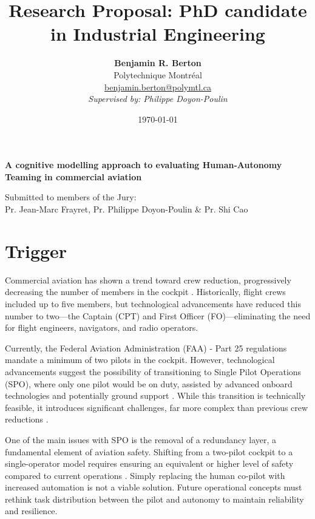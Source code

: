 \documentclass[12pt,a4paper]{article} %
\title{\textbf{Research Proposal: PhD candidate in Industrial Engineering}} %
\author{
	\textbf{Benjamin R. Berton}\\
	Polytechnique Montréal\\
	\href{mailto:benjamin.berton@polymtl.ca}{benjamin.berton@polymtl.ca}\\
	\textit{Supervised by: Philippe Doyon-Poulin}
} %
\begin{document}
	\maketitle %
	
	\begin{center}
		\textbf{A cognitive modelling approach to evaluating Human-Autonomy Teaming in commercial aviation}
	\end{center} %
	
	\begin{center}
		Submitted to members of the Jury:\\
		Pr. Jean-Marc Frayret, Pr. Philippe Doyon-Poulin \& Pr. Shi Cao\\
		\date{\today} %
	\end{center} %
	
	\newpage %
	
	\tableofcontents %
	\newpage %
	
	\section{Trigger} %
	Commercial aviation has shown a trend toward crew reduction, progressively decreasing the number of members in the cockpit \parencite{harris_human-centred_2007}. Historically, flight crews included up to five members, but technological advancements have reduced this number to two—the Captain (CPT) and First Officer (FO)—eliminating the need for flight engineers, navigators, and radio operators.
	
	Currently, the Federal Aviation Administration (FAA) - Part 25 regulations mandate a minimum of two pilots in the cockpit. However, technological advancements suggest the possibility of transitioning to Single Pilot Operations (SPO), where only one pilot would be on duty, assisted by advanced onboard technologies and potentially ground support \parencite{bilimoria_conceptual_2014}. While this transition is technically feasible, it introduces significant challenges, far more complex than previous crew reductions \parencite{matessa_using_2017}.
	
	One of the main issues with SPO is the removal of a redundancy layer, a fundamental element of aviation safety. Shifting from a two-pilot cockpit to a single-operator model requires ensuring an equivalent or higher level of safety compared to current operations \parencite{boy_requirements_2014}. Simply replacing the human co-pilot with increased automation is not a viable solution. Future operational concepts must rethink task distribution between the pilot and autonomy to maintain reliability and resilience.
	
\end{document}

